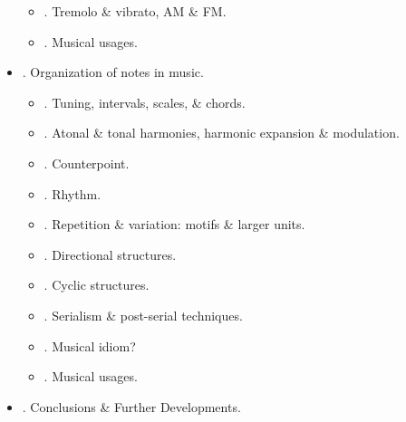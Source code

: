 \documentclass{article}
\begin{document}
\begin{itemize}
\begin{itemize}
		\item {. Tremolo \& vibrato, AM \& FM.}
		\item {. Musical usages.}
	\end{itemize}
	\item {. Organization of notes in music.}
	\begin{itemize}
		\item {. Tuning, intervals, scales, \& chords.}
		\item {. Atonal \& tonal harmonies, harmonic expansion \& modulation.}
		\item {. Counterpoint.}
		\item {. Rhythm.}
		\item {. Repetition \& variation: motifs \& larger units.}
		\item {. Directional structures.}
		\item {. Cyclic structures.}
		\item {. Serialism \& post-serial techniques.}
		\item {. Musical idiom?}
		\item {. Musical usages.}
	\end{itemize}
	\item {. Conclusions \& Further Developments.}
\end{itemize}

\end{document}
